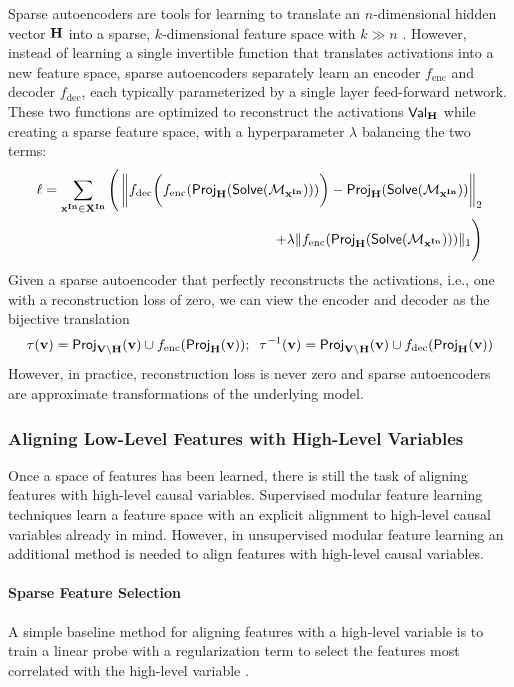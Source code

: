 \documentclass[twoside,11pt]{article}
\begin{document}
Sparse autoencoders are tools for learning to translate an $n$-dimensional hidden vector $\mathbf{H}$ into a sparse, $k$-dimensional feature space with $k \gg n$ \citep{bricken2023monosemanticity,Cunningham:2023,huben2024sparse, marks2024sparse}. However, instead of learning a single invertible function that translates activations into a new feature space, sparse autoencoders separately learn an encoder $f_{\text{enc}}$ and decoder $f_{\text{dec}}$, each typically parameterized by a single layer feed-forward network. These two functions are optimized to reconstruct the activations $\mathsf{Val}_{\mathbf{H}}$ while creating a sparse feature space, with a hyperparameter $\lambda$ balancing the two terms: 
\begin{align*}
\ell = \sum_{\mathbf{x}^{\mathbf{In}} \in \mathbf{X}^{\mathbf{In}}} \Bigg( \left\Vert f_{\text{dec}}\bigg (f_{\text{enc}}(\mathsf{Proj}_{\mathbf{H}}(\mathsf{Solve}(\mathcal{M}_{\mathbf{x}^{\mathbf{In}}})))\bigg) - \mathsf{Proj}_{\mathbf{H}}(\mathsf{Solve}(\mathcal{M}_{\mathbf{x}^{\mathbf{In}}}))\right\Vert_{2} \\
+ \lambda \Vert f_{\text{enc}}(\mathsf{Proj}_{\mathbf{H}}(\mathsf{Solve}(\mathcal{M}_{\mathbf{x}^{\mathbf{In}}}))) \Vert_{1} \Bigg)\\
\end{align*}
Given a sparse autoencoder that perfectly reconstructs the activations, i.e., one with a reconstruction loss of zero, we can view the encoder and decoder as the bijective translation
\[\tau(\mathbf{v}) = \mathsf{Proj}_{\mathbf{V} \setminus \mathbf{H}}(\mathbf{v}) \cup f_{\text{enc}}(\mathsf{Proj}_{\mathbf{H}}(\mathbf{v}));\;\;\tau^{-1}(\mathbf{v}) = \mathsf{Proj}_{\mathbf{V} \setminus \mathbf{H}}(\mathbf{v}) \cup f_{\text{dec}}(\mathsf{Proj}_{\mathbf{H}}(\mathbf{v}))\]
However, in practice, reconstruction loss is never zero and sparse autoencoders are approximate transformations of the underlying model.

\subsubsection{Aligning Low-Level Features with High-Level Variables}
Once a space of features has been learned, there is still the task of aligning features with high-level causal variables. Supervised modular feature learning techniques learn a feature space with an explicit alignment to high-level causal variables already in mind. However, in unsupervised modular feature learning an additional method is needed to align features with high-level causal variables.

\paragraph{Sparse Feature Selection}
A simple baseline method for aligning features with a high-level variable is to train a linear probe with a regularization term to select the features most correlated with the high-level variable \citep{huang2024ravel}.
\end{document}
